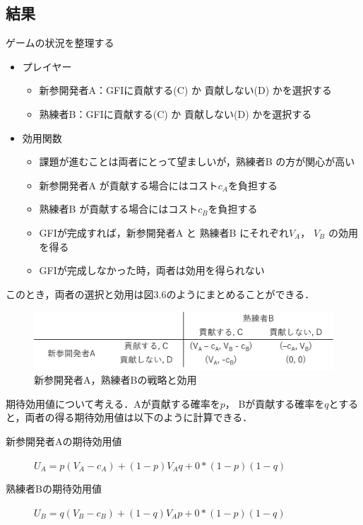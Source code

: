 \documentclass[11pt]{jreport}
\begin{document}
\subsection{結果}
ゲームの状況を整理する

\begin{itemize}
  \item プレイヤー
    \begin{itemize}
      \item 新参開発者A：GFIに貢献する(C) か 貢献しない(D) かを選択する
      \item 熟練者B：GFIに貢献する(C) か 貢献しない(D) かを選択する
    \end{itemize}
  \item 効用関数
    \begin{itemize}
      \item 課題が進むことは両者にとって望ましいが，熟練者B の方が関心が高い
      \item 新参開発者A が貢献する場合にはコスト$c_A$を負担する 
      \item 熟練者B が貢献する場合にはコスト$c_B$を負担する 
      \item GFIが完成すれば，新参開発者A と 熟練者B にそれぞれ$V_A$， $V_B$ の効用を得る
      \item GFIが完成しなかった時，両者は効用を得られない
    \end{itemize}
\end{itemize}

このとき，両者の選択と効用は図3.6のようにまとめることができる．

\begin{figure}[H]
\centerline{\includegraphics[width=0.9\linewidth]{@BSthesis2024_Nakai/BSthesis2024_Nakai_fig/ritoku.png}}
\caption{新参開発者A，熟練者Bの戦略と効用}
\label{fig:milestone}
\end{figure}

期待効用値について考える．Aが貢献する確率を$p$， Bが貢献する確率を$q$とすると，両者の得る期待効用値は以下のように計算できる．

\begin{description}
    \item [新参開発者Aの期待効用値] $U_A = p(V_A -c_A) + (1 - p)V_Aq + 0*(1-p)(1-q)$
    \item [熟練者Bの期待効用値] $U_B = q(V_B -c_B) + (1 - q)V_Ap + 0*(1-p)(1-q)$
\end{description}
\end{document}
